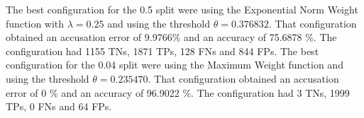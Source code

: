 The best configuration for the 0.5 split were using the Exponential Norm Weight
function with $\lambda = 0.25$ and using the threshold $\theta = 0.376832$.
That configuration obtained an accusation error of 9.9766\% and an accuracy of
75.6878 \%. The configuration had 1155 \gls{TN}s, 1871 \gls{TP}s, 128 \gls{FN}s
and 844 \gls{FP}s. The best configuration for the 0.04 split were using the
Maximum Weight function and using the threshold $\theta = 0.235470$. That
configuration obtained an accusation error of 0 \% and an accuracy of 96.9022
\%. The configuration had 3 \gls{TN}s, 1999 \gls{TP}s, 0 \gls{FN}s and 64
\gls{FP}s.

